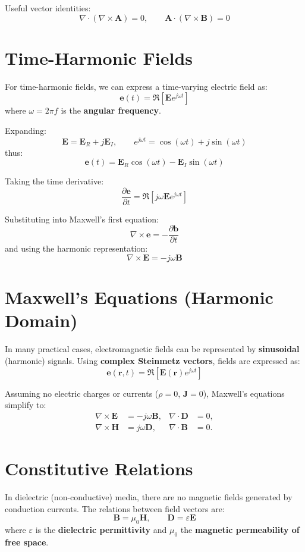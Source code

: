 Useful vector identities:
\[
\nabla \cdot (\nabla \times \mathbf{A}) = 0,
\qquad
\mathbf{A} \cdot (\nabla \times \mathbf{B}) = 0
\]


\section{Time-Harmonic Fields}

For time-harmonic fields, we can express a time-varying electric field as:
\[
\mathbf{e}(t) = \Re \left[ \mathbf{E} e^{j\omega t} \right]
\]
where $\omega = 2\pi f$ is the \textbf{angular frequency}.

Expanding:
\[
\mathbf{E} = \mathbf{E}_R + j\mathbf{E}_I, \qquad
e^{j\omega t} = \cos(\omega t) + j\sin(\omega t)
\]
thus:
\[
\mathbf{e}(t) = \mathbf{E}_R \cos(\omega t) - \mathbf{E}_I \sin(\omega t)
\]

Taking the time derivative:
\[
\frac{\partial \mathbf{e}}{\partial t} = 
\Re \left[ j\omega \mathbf{E} e^{j\omega t} \right]
\]

Substituting into Maxwell’s first equation:
\[
\nabla \times \mathbf{e} = -\frac{\partial \mathbf{b}}{\partial t}
\]
and using the harmonic representation:
\[
\nabla \times \mathbf{E} = -j\omega \mathbf{B}
\]

\section{Maxwell’s Equations (Harmonic Domain)}

In many practical cases, electromagnetic fields can be represented by \textbf{sinusoidal} (harmonic) signals.  
Using \textbf{complex Steinmetz vectors}, fields are expressed as:
\[
\mathbf{e}(\mathbf{r}, t) = \Re [ \mathbf{E}(\mathbf{r}) e^{j\omega t} ]
\]

Assuming no electric charges or currents ($\rho = 0$, $\mathbf{J} = 0$), Maxwell’s equations simplify to:
\begin{align}
\nabla \times \mathbf{E} &= -j\omega \mathbf{B}, &
\nabla \cdot \mathbf{D} &= 0, \\
\nabla \times \mathbf{H} &= j\omega \mathbf{D}, &
\nabla \cdot \mathbf{B} &= 0.
\end{align}

\section{Constitutive Relations}

In dielectric (non-conductive) media, there are no magnetic fields generated by conduction currents.  
The relations between field vectors are:
\[
\mathbf{B} = \mu_0 \mathbf{H}, \qquad
\mathbf{D} = \varepsilon \mathbf{E}
\]
where $\varepsilon$ is the \textbf{dielectric permittivity} and $\mu_0$ the \textbf{magnetic permeability of free space}.

